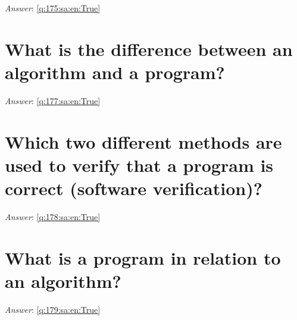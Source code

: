 \documentclass[a4paper,11pt,oneside]{book}
\begin{document}
\begin{sloppypar}
\label{q:175:sa:en:False}

\vspace{2cm}

\noindent\makebox[\textwidth]{\hrulefill}

\vspace{1cm}

\textit{Answer}: \autoref{q:175:sa:en:True}



\section{What is the difference between an algorithm and a program?}

\label{q:177:sa:en:False}

\vspace{2cm}

\noindent\makebox[\textwidth]{\hrulefill}

\vspace{1cm}

\textit{Answer}: \autoref{q:177:sa:en:True}



\section{Which two different methods are used to verify that a program is correct (software verification)?}

\label{q:178:sa:en:False}

\vspace{2cm}

\noindent\makebox[\textwidth]{\hrulefill}

\vspace{1cm}

\textit{Answer}: \autoref{q:178:sa:en:True}



\section{What is a program in relation to an algorithm?}

\label{q:179:sa:en:False}

\vspace{2cm}

\noindent\makebox[\textwidth]{\hrulefill}

\vspace{1cm}

\textit{Answer}: \autoref{q:179:sa:en:True}




\end{sloppypar}
\end{document}
